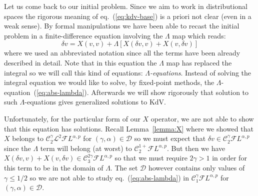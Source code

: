 \documentclass[a4paper,11pt,reqno]{article}
\newcommand{\der}{\delta}
\newcommand{\CC}{\mathcal{C}}
\newcommand{\DD}{\mathcal{D}}
\newcommand{\FF}{\mathcal{F}}
\newcommand{\LL}{\mathcal{L}}
\begin{document}
Let us come back to our initial problem. Since we aim to work in distributional spaces the rigorous meaning of eq.~(\ref{eq:kdv-base}) is a priori not clear (even in a weak sense). By formal manipulations we have been able to recast the initial problem in a finite-difference equation involving the $\Lambda$ map which reads:
\begin{equation}
  \label{eq:abs-lambda}
\der v = X(v,v) + \Lambda[X(\der v, v) + X(v, \der v)]   
\end{equation}
where we used an abbreviated notation since all the terms have been
already described in detail. Note that in this equation the $\Lambda$ map has replaced the integral
 so we
will call this kind of equations: \emph{$\Lambda$-equations}. Instead
of solving the integral equation 
we would like to  solve, by fixed-point
methods, the $\Lambda$-equation~(\ref{eq:abs-lambda}). Afterwards we will show rigorously that solution to such $\Lambda$-equations gives generalized solutions to KdV.

  Unfortunately,
for the particular form of our $X$ operator, we are not able to show
that this equation has solutions. Recall  Lemma~\ref{lemma:X} where we showed that $X$ belongs to 
$\CC_2^\gamma \LL^2 \FF L^{\alpha,p}$ for $(\gamma,\alpha) \in \DD$ so we
must expect that $\der v \in \CC_2^\gamma  \FF L^{\alpha,p}$ since the
$\Lambda$ term will belong (at worst) to $\CC_2^{1+}  \FF L^{\alpha,p}$. But then we have
$
X(\der v,v) + X(v,\der v) \in \CC_3^{2\gamma} \FF L^{\alpha,p}
$ 
so that we must require $2\gamma > 1$ in order for this term to be in
the domain of $\Lambda$. The  set $\DD$ however contains only
values of $\gamma \le 1/2$ so we are not able to study
eq.~(\ref{eq:abs-lambda}) in $\CC_1^\gamma  \FF L^{\alpha,p}$ for
$(\gamma,\alpha) \in \DD$.
\end{document}
